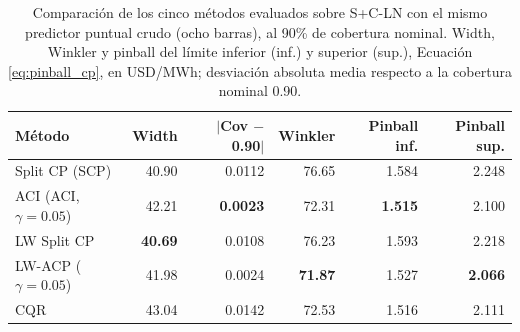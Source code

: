 \begin{table}[htbp]
    \centering
    \begin{tabular}{lrrrrr}
        \toprule
        Método & Width & $|$Cov $-$ 0.90$|$ & Winkler & Pinball inf. & Pinball sup. \\
        \midrule
        Split CP (SCP)              & 40.90 & 0.0112 & 76.65 & 1.584 & 2.248 \\
        ACI (ACI, $\gamma=0.05$)    & 42.21 & \textbf{0.0023} & 72.31 & \textbf{1.515} & 2.100 \\
        LW Split CP                 & \textbf{40.69} & 0.0108 & 76.23 & 1.593 & 2.218 \\
        LW-ACP ($\gamma=0.05$)      & 41.98 & 0.0024 & \textbf{71.87} & 1.527 & \textbf{2.066} \\
        CQR                         & 43.04 & 0.0142 & 72.53 & 1.516 & 2.111 \\
        \bottomrule
    \end{tabular}
    \caption{Comparación de los cinco métodos evaluados sobre S+C-LN con el mismo predictor puntual crudo (ocho barras), al 90\% de cobertura nominal. Width, Winkler y pinball del límite inferior (inf.) y superior (sup.), Ecuación \ref{eq:pinball_cp}, en USD/MWh; desviación absoluta media respecto a la cobertura nominal 0.90.}
    \label{tab:lw_comparativa}
\end{table}


